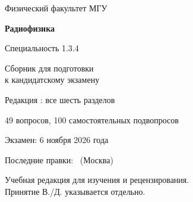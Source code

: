 \documentclass[11pt,a4paper,oneside]{report}
\begin{document}
\ifdefined\SubsetBuild
{}\QuestionList
\else
\begin{titlepage}
\centering\vspace*{20mm}
{\Large Физический факультет МГУ\par}\vspace{15mm}
{\Huge\bfseries Радиофизика\par}\vspace{6mm}
{\LARGE Специальность 1.3.4\par}\vspace{14mm}
{\Large Сборник для подготовки\\к кандидатскому экзамену\par}\vspace{14mm}
{\large Редакция \ProjectVersion: все шесть разделов\par}\vspace{5mm}
49 вопросов, 100 самостоятельных подвопросов\par
\vfill Экзамен: 6 ноября 2026 года\par
Последние правки: \LastEditDate\ (Москва)\par\vspace{9mm}
{\small Учебная редакция для изучения и рецензирования.\\Принятие В./Д. указывается отдельно.}
\end{titlepage}

\tableofcontents
\QuestionList

\clearpage{}
\fi
{}
\biblio
\end{document}
